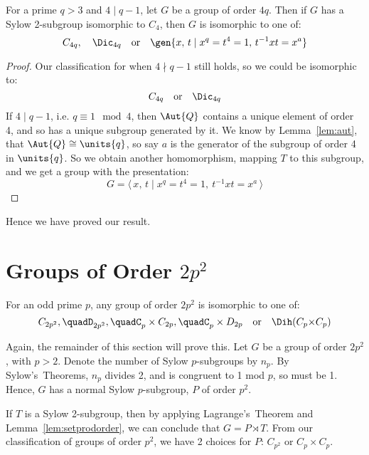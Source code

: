 \begin{lemma}
    For a prime \(q > 3\) and \(4 \mid q-1\), let \(G\) be a group of order \(4q\).
    Then if \(G\) has a Sylow 2-subgroup isomorphic to \(C_{4}\), then \(G\) is isomorphic to one of:
    \[%
        C_{4q}, \quad%
        \Dic_{4q} \quad \text{or} \quad%
        \gen{x,\, t \mid x^q = t^4 = 1,\, t^{-1}xt = x^a}
    \]
\end{lemma}

\begin{proof}
    Our classification for when \(4 \nmid q-1\) still holds, so we could be isomorphic to:
    \[
        C_{4q} \quad \text{or} \quad%
        \Dic_{4q}%
    \]
    If \(4 \mid q-1\), i.e. \(q \equiv 1 \mod{4}\), then \(\Aut{Q}\) contains a unique element of order 4, and so
    has a unique subgroup generated by it.
    We know by Lemma~\ref{lem:aut}, that \(\Aut{Q} \cong \units{q}\), so say \(a\) is the generator of the
    subgroup of order 4 in \(\units{q}\).
    So we obtain another homomorphism, mapping \(T\) to this subgroup, and we get a group with the presentation:
    \[G = \langle\, x,\,t \mid x^q = t^4 = 1,\ t^{-1}xt = x^{a}\,\rangle\]
\end{proof}

Hence we have proved our result.

\section{Groups of Order \(2p^2\)}
\begin{theorem}\label{thm:2p_squared}
    For an odd prime \(p\), any group of order \(2p^2\) is isomorphic to one of:
    \[%
        C_{2p^2}, \quad%
        D_{2p^2}, \quad%
        C_p \times C_{2p}, \quad%
        C_p \times D_{2p} \quad \text{or} \quad%
        \Dih(C_p {\times} C_p)
    \]
\end{theorem}

Again, the remainder of this section will prove this.
Let \(G\) be a group of order \(2p^2\), with \(p > 2\).
Denote the number of Sylow \(p\)-subgroups by \(n_p\).
By Sylow's~Theorems, \(n_p\) divides 2, and is congruent to 1 mod \(p\), so must be 1.
Hence, \(G\) has a normal Sylow \(p\)-subgroup, \(P\) of order \(p^2\).

If \(T\) is a Sylow 2-subgroup, then by applying Lagrange's~Theorem and Lemma~\ref{lem:setprodorder}, we can conclude
that \(G = P \rtimes T\).
From our classification of groups of order \(p^2\), we have 2 choices for \(P\): \(C_{p^2}\) or \(C_{p} \times C_{p}\).

